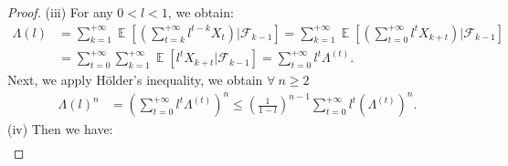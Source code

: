 \documentclass{article} %
\DeclareMathOperator{\Expect}{\mathbb{E}}
\begin{document}
\begin{proof}
(iii) For any \(0 < l < 1\), we obtain:
\begin{align*}
    \Lambda(l)&=\sum_{k=1}^{+\infty}\Expect\left[\left(\sum_{t=k}^{+\infty}l^{t-k}X_{t}\right)\bigg|\mathscr{F}_{k-1}\right]=\sum_{k=1}^{+\infty}\Expect\left[\left(\sum_{t=0}^{+\infty}l^{t}X_{k+t}\right)\bigg|\mathscr{F}_{k-1}\right]\\&=\sum_{t=0}^{+\infty}\sum_{k=1}^{+\infty}\Expect\left[l^{t}X_{k+t}\bigg|\mathscr{F}_{k-1}\right]=\sum_{t=0}^{+\infty}l^{t}\Lambda^{(t)}.
\end{align*}
Next, we apply Hölder's inequality, we obtain $\forall\ n\ge 2$
\begin{align*}
    \Lambda(l)^{n}&=\left(\sum_{t=0}^{+\infty}l^{t}\Lambda^{(t)}\right)^{n}\le \left(\frac{1}{1-l}\right)^{n-1}\sum_{t=0}^{+\infty}l^{t}(\Lambda^{(t)})^{n}.
\end{align*}
(iv) Then we have:
\begin{align*}

\end{align*}
\end{proof}
\end{document}
